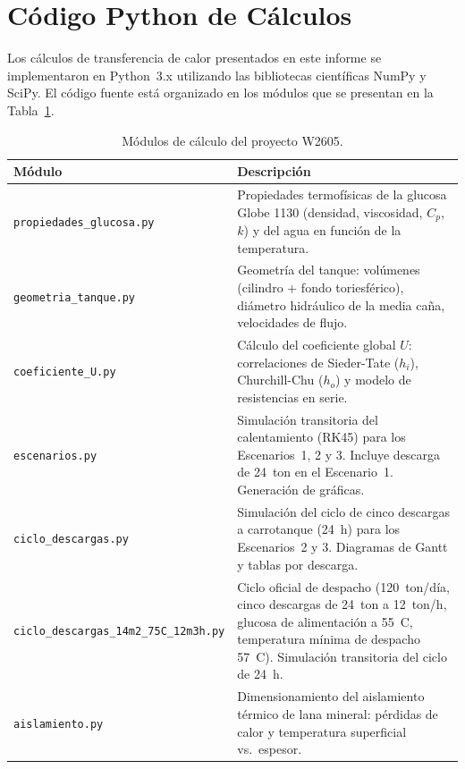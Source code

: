 \appendix

\section{C\'odigo Python de C\'alculos}
\label{appendix:codigo}

Los c\'alculos de transferencia de calor presentados en este informe se implementaron en Python~3.x utilizando las bibliotecas cient\'ificas NumPy y SciPy. El c\'odigo fuente est\'a organizado en los m\'odulos que se presentan en la Tabla~\ref{tab:modulos_python}.

\begin{table}[H]
	\centering
	\caption{M\'odulos de c\'alculo del proyecto W2605.}
	\label{tab:modulos_python}
	\begin{tabularx}{\textwidth}{@{}lX@{}}
		\toprule
		\textbf{M\'odulo} & \textbf{Descripci\'on} \\
		\midrule
		\texttt{propiedades\_glucosa.py} & Propiedades termof\'isicas de la glucosa Globe 1130 (densidad, viscosidad, $C_p$, $k$) y del agua en funci\'on de la temperatura. \\
		\texttt{geometria\_tanque.py} & Geometr\'ia del tanque: vol\'umenes (cilindro + fondo toriesf\'erico), di\'ametro hidr\'aulico de la media ca\~na, velocidades de flujo. \\
		\texttt{coeficiente\_U.py} & C\'alculo del coeficiente global $U$: correlaciones de Sieder-Tate ($h_i$), Churchill-Chu ($h_o$) y modelo de resistencias en serie. \\
		\texttt{escenarios.py} & Simulaci\'on transitoria del calentamiento (RK45) para los Escenarios~1, 2 y 3. Incluye descarga de 24~ton en el Escenario~1. Generaci\'on de gr\'aficas. \\
		\texttt{ciclo\_descargas.py} & Simulaci\'on del ciclo de cinco descargas a carrotanque (24~h) para los Escenarios~2 y 3. Diagramas de Gantt y tablas por descarga. \\
		\texttt{ciclo\_descargas\_14m2\_75C\_12m3h.py} & Ciclo oficial de despacho (120~ton/d\'ia, cinco descargas de 24~ton a 12~ton/h, glucosa de alimentaci\'on a 55~\textdegree C, temperatura m\'inima de despacho 57~\textdegree C). Simulaci\'on transitoria del ciclo de 24~h. \\
		\texttt{aislamiento.py} & Dimensionamiento del aislamiento t\'ermico de lana mineral: p\'erdidas de calor y temperatura superficial vs.\ espesor. \\
		\bottomrule
	\end{tabularx}
\end{table}

